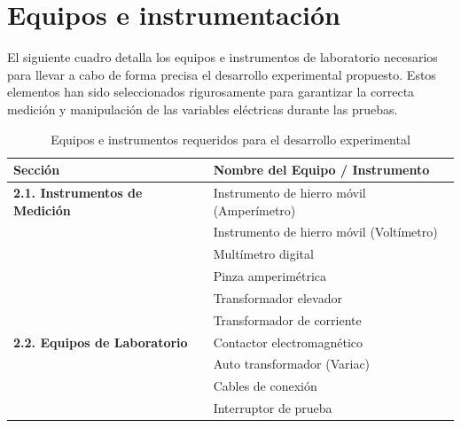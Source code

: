 \section{Equipos e instrumentación}

El siguiente cuadro detalla los equipos e instrumentos de laboratorio necesarios para llevar a cabo de forma precisa el desarrollo experimental propuesto. Estos elementos han sido seleccionados rigurosamente para garantizar la correcta medición y manipulación de las variables eléctricas durante las pruebas.

\begin{table}[htbp]
\caption{Equipos e instrumentos requeridos para el desarrollo experimental}
\label{tab:equipos_laboratorio_estilo}
\centering
\begin{tabular}{ll}
\hline
\textbf{Sección} & \textbf{Nombre del Equipo / Instrumento} \\ \hline
\textbf{2.1. Instrumentos de Medición} & Instrumento de hierro móvil (Amperímetro) \\
                                       & Instrumento de hierro móvil (Voltímetro) \\
                                       & Multímetro digital \\ 
                                       & Pinza amperimétrica \\
                                       & Transformador elevador \\
                                       & Transformador de corriente \\ \hline
\textbf{2.2. Equipos de Laboratorio}   & Contactor electromagnético \\
                                       & Auto transformador (Variac) \\
                                       & Cables de conexión \\
                                       & Interruptor de prueba \\ \hline
\end{tabular}
\end{table}